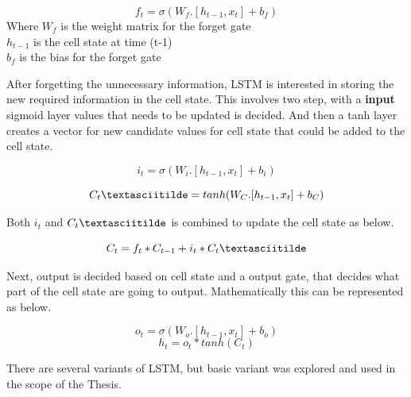 \begin{equation}
f_t = \sigma(W_f. [h_{t-1}, x_t  ] + b_f)
\end{equation}
Where $W_f$ is the weight matrix for the forget gate \\
$h_{t-1}$ is the cell state at time (t-1) \\
$b_f$ is the bias for the forget gate

After forgetting the unnecessary information, LSTM is interested in storing the new required information in the cell state. This involves two step, with a \textbf{input} sigmoid layer values that needs to be updated is decided. And then a tanh layer creates a vector for new candidate values for cell state that could be added to the cell state. 

\begin{equation}
i_t = \sigma(W_i. [h_{t-1}, x_t  ] + b_i)
\end{equation}

\begin{equation}
C_t\textasciitilde = tanh(W_C. [h_{t-1}, x_t ] + b_C)
\end{equation}

Both $i_t$ and $C_t\textasciitilde$ is combined to update the cell state as below.

\begin{equation}
C_t = f_t * C_{t-1} + i_t * C_t\textasciitilde
\end{equation}

Next, output is decided based on cell state and a output gate, that decides what part of the cell state are going to output. Mathematically this can be represented as below.

\begin{equation}
o_t = \sigma(W_o. [h_{t-1}, x_t  ] + b_o)
\end{equation}
\begin{equation}
h_t = o_t  * tanh(C_t)
\end{equation}

There are several variants of LSTM, but basic variant was explored and used in the scope of the Thesis.

